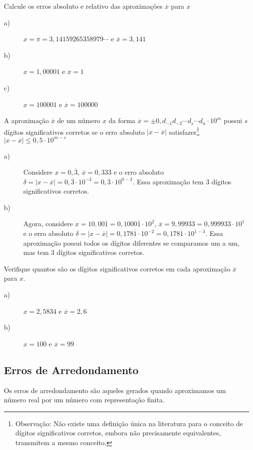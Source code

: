 \begin{prob}Calcule os erros absoluto e relativo das aproximações $\overline{x}$ para $x$
\begin{description}
\item[a)] $x=\pi=3,14159265358979\cdots$ e $\overline{x}=3,141$
\item[b)] $x=1,00001$ e $\overline{x}=1$
\item[c)] $x=100001$ e $\overline{x}=100000$
\end{description}
\end{prob}

\begin{defn}
A aproximação $\overline{x}$ de um número $x$ da forma $\overline{x}=\pm 0,d_{-1}d_{-2}\cdots d_{s}\cdots d_n\cdot 10^m$ possui $s$ dígitos significativos corretos se o erro absoluto $|x-\overline{x}|$ satisfazer\footnote{Observação: Não existe uma definição única na literatura para o conceito de dígitos significativos corretos, embora não precisamente equivalentes, transmitem a mesmo conceito.}
$
|x-\overline{x}|\leq 0,5\cdot 10^{m-s}
$
\end{defn}
\begin{ex}
\begin{description}
\item[a)] Considere $x=0,\overline{3}$, $\overline{x}=0,333$ e o erro absoluto $\delta=|x-\overline{x}|=0,\overline{3}\cdot 10^{-3}=0,\overline{3}\cdot 10^{0-3}$. Essa aproximação tem 3 dígitos significativos corretos.
\item[b)] Agora, considere $x=10,00\overline{1}=0,1000\overline{1}\cdot 10^{2}$, $\overline{x}=9,99933=0,999933\cdot 10^1$ e o erro absoluto $\delta=|x-\overline{x}|=0,178\overline{1}\cdot 10^{-2}=0,178\overline{1}\cdot 10^{1-3}$. Essa aproximação possui todos os dígitos diferentes se comparamos um a um, mas tem 3 dígitos significativos corretos.
\end{description}
\end{ex}
\begin{prob}
Verifique quantos são os dígitos significativos corretos em cada aproximação $\overline{x}$ para $x$.
\begin{description}
\item[a)] $x=2,5834$ e $\overline{x}=2,6$
\item[b)] $x=100$ e $\overline{x}=99$
\end{description}
\end{prob}



\subsection{Erros de Arredondamento}{\label{arredondamento_sec}}
Os erros de arredondamento são aqueles gerados quando aproximamos um número real por um número com representação finita.

